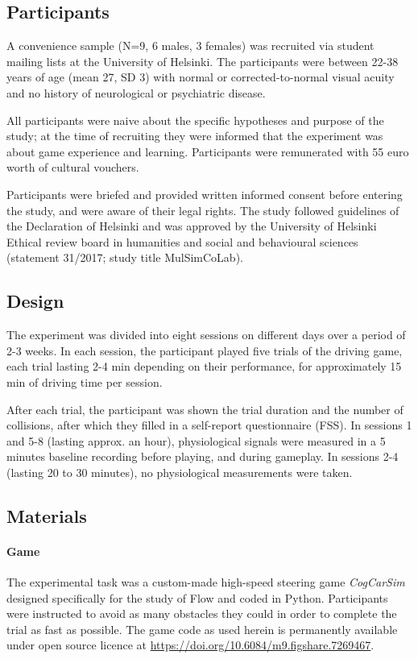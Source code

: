 
\subsection*{Participants}
A convenience sample (N=9, 6 males, 3 females) was recruited via student mailing lists at the University of Helsinki. The participants were between 22-38 years of age (mean 27, SD 3) with normal or corrected-to-normal visual acuity and no history of neurological or psychiatric disease.

All participants were naive about the specific hypotheses and purpose of the study; at the time of recruiting they were informed that the experiment was about game experience and learning. Participants were remunerated with 55 euro worth of cultural vouchers.

Participants were briefed and provided written informed consent before entering the study, and were aware of their legal rights. The study followed guidelines of the Declaration of Helsinki and was approved by the University of Helsinki Ethical review board in humanities and social and behavioural sciences (statement 31/2017; study title MulSimCoLab).

\subsection*{Design}
The experiment was divided into eight sessions on different days over a period of 2-3 weeks. In each session, the participant played five trials of the driving game, each trial lasting 2-4 min depending on their performance, for approximately 15 min of driving time per session.

After each trial, the participant was shown the trial duration and the number of collisions, after which they filled in a self-report questionnaire (FSS). In sessions 1 and 5-8 (lasting approx. an hour), physiological signals were measured in a 5 minutes baseline recording before playing, and during gameplay. In sessions 2-4 (lasting 20 to 30 minutes), no physiological measurements were taken.

\subsection*{Materials}
\paragraph{Game} The experimental task was a custom-made high-speed steering game {\it CogCarSim} designed specifically for the study of Flow and coded in Python. Participants were instructed to avoid as many obstacles they could in order to complete the trial as fast as possible. The game code as used herein is permanently available under open source licence at \url{https://doi.org/10.6084/m9.figshare.7269467}.

